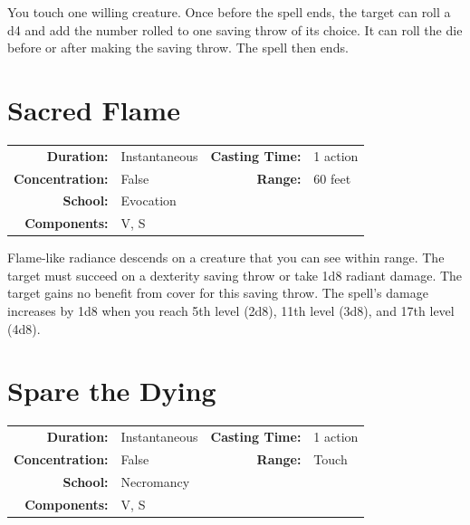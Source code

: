 \documentclass[12pt,showtrims]{memoir}
\begin{document}
\vspace{1\baselineskip}\noindent You touch one willing creature. Once before the spell ends, the target can roll a d4 and add the number rolled to one saving throw of its choice. It can roll the die before or after making the saving throw. The spell then ends.

\newpage
\section*{Sacred Flame}

{
\small\centering\vspace{-6pt}
\begin{tabular}{rlrl}
\toprule

\textbf{Duration:} & Instantaneous &
\textbf{Casting Time:} & 1 action \\
\textbf{Concentration:} & False &
\textbf{Range:} & 60 feet \\
\textbf{School:} & Evocation \\
\textbf{Components:} & \multicolumn{3}{p{0.7\textwidth}}{V, S}\\

\bottomrule
\end{tabular}
}

\vspace{1\baselineskip}\noindent Flame-like radiance descends on a creature that you can see within range. The target must succeed on a dexterity saving throw or take 1d8 radiant damage. The target gains no benefit from cover for this saving throw. The spell's damage increases by 1d8 when you reach 5th level (2d8), 11th level (3d8), and 17th level (4d8).

\newpage
\section*{Spare the Dying}

{
\small\centering\vspace{-6pt}
\begin{tabular}{rlrl}
\toprule

\textbf{Duration:} & Instantaneous &
\textbf{Casting Time:} & 1 action \\
\textbf{Concentration:} & False &
\textbf{Range:} & Touch \\
\textbf{School:} & Necromancy \\
\textbf{Components:} & \multicolumn{3}{p{0.7\textwidth}}{V, S}\\

\bottomrule
\end{tabular}
}
\end{document}

